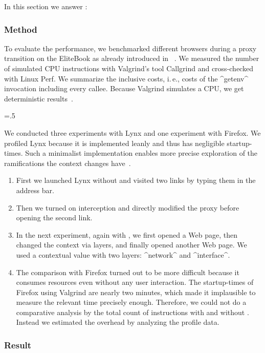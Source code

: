 
In this section we answer :
\rqUnmodifiedPerformance*


\subsubsection{Method}

To evaluate the performance, we benchmarked different browsers during a proxy transition on the EliteBook as already introduced in ~\cite{raab2017introducing}.
We measured the number of simulated CPU instructions with Valgrind's tool Callgrind and cross-checked with Linux Perf.
We summarize the inclusive costs, i.\,e., costs of the ^getenv^ invocation including every callee.
Because Valgrind simulates a CPU, we get deterministic results~\cite{raab2017introducing}.%
{\parfillskip=0pt \emergencystretch=.5\textwidth \par}

We conducted three experiments with Lynx and one experiment with Firefox.
We profiled Lynx because it is implemented leanly and thus has negligible startup-times.
Such a minimalist implementation enables more precise exploration of the ramifications the context changes have~\cite{raab2017introducing}.
\begin{enumerate}
\item 
First we launched Lynx without \elektra{} and visited two links by typing them in the address bar.
\item
Then we turned on \elektra{} interception and directly modified the proxy before opening the second link.
\item
In the next experiment, again with \elektra{}, we first opened a Web page, then changed the context via layers, and finally opened another Web page.
We used a contextual value with two layers: ^network^ and ^interface^.
\item
The comparison with Firefox turned out to be more difficult because it consumes resources even without any user interaction.
The startup-times of Firefox using Valgrind are nearly two minutes, which made it implausible to measure the relevant time precisely enough.
Therefore, we could not do a comparative analysis by the total count of instructions with and without \elektra{}.
Instead we estimated the overhead by analyzing the profile data.
\end{enumerate}


\subsubsection{Result}



